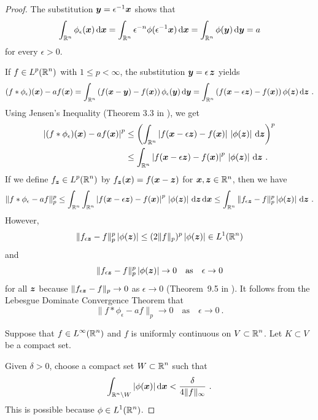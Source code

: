 \begin{proof}
The substitution ${\bm{y}} = \epsilon^{-1} {\bm{x}}$ shows that
\[
\int_{\mathbb{R}^n} \phi_\epsilon({\bm{x}}) \,\mathrm{d}{{\bm{x}}} 
= \int_{\mathbb{R}^n} \epsilon^{-n} \phi(\epsilon^{-1} {\bm{x}}) \,\mathrm{d}{{\bm{x}}} 
= \int_{\mathbb{R}^n} \phi({\bm{y}}) \,\mathrm{d}{{\bm{y}}} = a
\]
for every $\epsilon >0$.

 If $\displaystyle f\in L^p(\mathbb{R}^n)$ with $1\leq p < \infty$,
the substitution ${\bm{y}} = \epsilon\, {\bm{z}}$ yields
\[
(f\ast \phi_\epsilon)({\bm{x}}) - a f({\bm{x}}) =
\int_{\mathbb{R}^n} \left( f({\bm{x}}-{\bm{y}}) - f({\bm{x}})
\right)\phi_\epsilon({\bm{y}}) \,\mathrm{d}{{\bm{y}}}
= \int_{\mathbb{R}^n} \left( f({\bm{x}}-\epsilon {\bm{z}}) - f({\bm{x}})
\right)\phi({\bm{z}}) \,\mathrm{d}{{\bm{z}}} \ .
\]
Using Jensen's Inequality (Theorem 3.3 in \cite{Ru}), we get
\begin{align*}
\left| (f\ast \phi_\epsilon)({\bm{x}}) - a f({\bm{x}}) \right|^p
&\leq \left( \int_{\mathbb{R}^n} \left| f({\bm{x}}-\epsilon {\bm{z}}) - f({\bm{x}})
\right| \,\left| \phi({\bm{z}})\right| \,\mathrm{d}{{\bm{z}}} \right)^p \\
&\leq \int_{\mathbb{R}^n} \left| f({\bm{x}}-\epsilon{\bm{z}}) - f({\bm{x}})
\right|^p \,\left| \phi({\bm{z}})\right| \,\mathrm{d}{{\bm{z}}} \ .
\end{align*}
If we define $\displaystyle f_{{\bm{z}}} \in L^p(\mathbb{R}^n)$ by
$f_{{\bm{z}}}({\bm{x}}) = f({\bm{x}}-{\bm{z}})$ for
${\bm{x}}, {\bm{z}}\in \mathbb{R}^n$, then we have
\[
\| f\ast \phi_\epsilon -a f \|_p^p
\leq \int_{\mathbb{R}^n} \int_{\mathbb{R}^n} \left| f({\bm{x}}-\epsilon {\bm{z}})
 - f({\bm{x}})\right|^p\, \left| \phi({\bm{z}})\right| \,\mathrm{d}{{\bm{z}}}
\,\mathrm{d}{{\bm{x}}}
\leq \int_{\mathbb{R}^n} \| f_{\epsilon{\bm{z}}} - f \|_p^p
\left|\phi({\bm{z}})\right|
\,\mathrm{d}{{\bm{z}}} \ .
\]
However,
\[
\| f_{\epsilon{\bm{z}}} - f \|_p^p \left|\phi({\bm{z}})\right| \leq
(2 \|f\|_p)^p \left|\phi({\bm{z}})\right| \in L^1(\mathbb{R}^n)
\]
and
\[
\| f_{\epsilon{\bm{z}}} - f \|_p^p \left|\phi({\bm{z}})\right| \rightarrow 0
\quad \text{as} \quad \epsilon \rightarrow 0
\]
for all ${\bm{z}}$ because
$\displaystyle \| f_{\epsilon{\bm{z}}} - f \|_p \rightarrow 0$
as $\epsilon \rightarrow 0$ (Theorem~9.5 in \cite{Ru}).  It follows from the
Lebesgue Dominate Convergence Theorem that
\[
\| f\ast \phi_\epsilon -a f \|_p \rightarrow 0 \quad \text{as} \quad
\epsilon \rightarrow 0 \ .
\]

 Suppose that $\displaystyle f \in L^\infty(\mathbb{R}^n)$ and $f$
is uniformly continuous on $\displaystyle V\subset \mathbb{R}^n$.
Let $K \subset V$ be a compact set.

Given $\delta >0$, choose a compact set
$\displaystyle W \subset \mathbb{R}^n$ such that
\[
\int_{\mathbb{R}^n\setminus W} |\phi({\bm{x}})| \,\mathrm{d}{{\bm{x}}} <
\frac{\delta}{4\|f\|_\infty} \ .
\]
This is possible because $\displaystyle \phi \in L^1(\mathbb{R}^n)$.


\end{proof}
